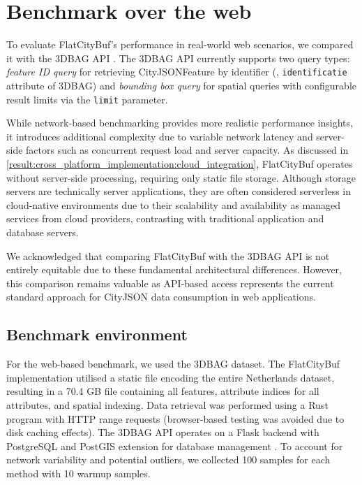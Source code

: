 \section{Benchmark over the web}
\label{result:benchmark_over_the_web}

To evaluate FlatCityBuf's performance in real-world web scenarios, we compared it with the 3DBAG API \citep{3dbag_api}. The 3DBAG API currently supports two query types: \textit{feature ID query} for retrieving CityJSONFeature by identifier (\eg, \texttt{identificatie} attribute of 3DBAG) and \textit{bounding box query} for spatial queries with configurable result limits via the \texttt{limit} parameter.

While network-based benchmarking provides more realistic performance insights, it introduces additional complexity due to variable network latency and server-side factors such as concurrent request load and server capacity. As discussed in \autoref{result:cross_platform_implementation:cloud_integration}, FlatCityBuf operates without server-side processing, requiring only static file storage. Although storage servers are technically server applications, they are often considered serverless in cloud-native environments due to their scalability and availability as managed services from cloud providers, contrasting with traditional application and database servers.

We acknowledged that comparing FlatCityBuf with the 3DBAG API is not entirely equitable due to these fundamental architectural differences. However, this comparison remains valuable as API-based access represents the current standard approach for CityJSON data consumption in web applications.

\subsection{Benchmark environment}
\label{result:benchmark_over_the_web:benchmark_environment}

For the web-based benchmark, we used the 3DBAG dataset. The FlatCityBuf implementation utilised a static file encoding the entire Netherlands dataset, resulting in a 70.4 GB file containing all features, attribute indices for all attributes, and spatial indexing. Data retrieval was performed using a Rust program with HTTP range requests (browser-based testing was avoided due to disk caching effects). The 3DBAG API operates on a Flask backend with PostgreSQL and PostGIS extension for database management \citep{powalka_2023}. To account for network variability and potential outliers, we collected 100 samples for each method with 10 warmup samples.

